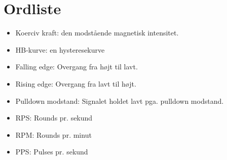 \section{Ordliste}
\begin{itemize}
\item Koerciv kraft: den modstående magnetisk intensitet.
\item HB-kurve: en hysteresekurve
\item Falling edge: Overgang fra højt til lavt.
\item Rising edge: Overgang fra lavt til højt.
\item Pulldown modstand: Signalet holdet lavt pga. pulldown modstand. 
\item RPS: Rounds pr. sekund 
\item RPM: Rounds pr. minut
\item PPS: Pulses pr. sekund
\end{itemize}
